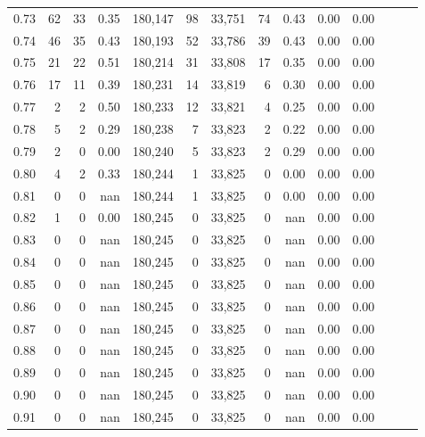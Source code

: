 \begin{tabular}{rrrrrrrrrrrrrr}
0.73 &     62 &     33 &  0.35 &  180,147 &       98 &  33,751 &      74 &  0.43 &  0.00 &      0.00 \\
0.74 &     46 &     35 &  0.43 &  180,193 &       52 &  33,786 &      39 &  0.43 &  0.00 &      0.00 \\
0.75 &     21 &     22 &  0.51 &  180,214 &       31 &  33,808 &      17 &  0.35 &  0.00 &      0.00 \\
0.76 &     17 &     11 &  0.39 &  180,231 &       14 &  33,819 &       6 &  0.30 &  0.00 &      0.00 \\
0.77 &      2 &      2 &  0.50 &  180,233 &       12 &  33,821 &       4 &  0.25 &  0.00 &      0.00 \\
0.78 &      5 &      2 &  0.29 &  180,238 &        7 &  33,823 &       2 &  0.22 &  0.00 &      0.00 \\
0.79 &      2 &      0 &  0.00 &  180,240 &        5 &  33,823 &       2 &  0.29 &  0.00 &      0.00 \\
0.80 &      4 &      2 &  0.33 &  180,244 &        1 &  33,825 &       0 &  0.00 &  0.00 &      0.00 \\
0.81 &      0 &      0 &   nan &  180,244 &        1 &  33,825 &       0 &  0.00 &  0.00 &      0.00 \\
0.82 &      1 &      0 &  0.00 &  180,245 &        0 &  33,825 &       0 &   nan &  0.00 &      0.00 \\
0.83 &      0 &      0 &   nan &  180,245 &        0 &  33,825 &       0 &   nan &  0.00 &      0.00 \\
0.84 &      0 &      0 &   nan &  180,245 &        0 &  33,825 &       0 &   nan &  0.00 &      0.00 \\
0.85 &      0 &      0 &   nan &  180,245 &        0 &  33,825 &       0 &   nan &  0.00 &      0.00 \\
0.86 &      0 &      0 &   nan &  180,245 &        0 &  33,825 &       0 &   nan &  0.00 &      0.00 \\
0.87 &      0 &      0 &   nan &  180,245 &        0 &  33,825 &       0 &   nan &  0.00 &      0.00 \\
0.88 &      0 &      0 &   nan &  180,245 &        0 &  33,825 &       0 &   nan &  0.00 &      0.00 \\
0.89 &      0 &      0 &   nan &  180,245 &        0 &  33,825 &       0 &   nan &  0.00 &      0.00 \\
0.90 &      0 &      0 &   nan &  180,245 &        0 &  33,825 &       0 &   nan &  0.00 &      0.00 \\
0.91 &      0 &      0 &   nan &  180,245 &        0 &  33,825 &       0 &   nan &  0.00 &      0.00 \\

\end{tabular}
